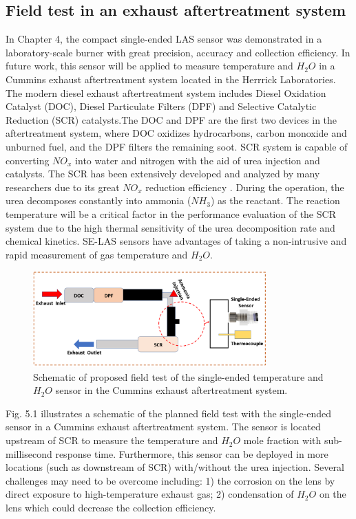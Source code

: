 \subsection{Field test in an exhaust aftertreatment system}
In Chapter 4, the compact single-ended LAS sensor was demonstrated in a laboratory-scale burner with great precision, accuracy and collection efficiency. In future work, this sensor will be applied to measure temperature and $H_2O$ in a Cummins exhaust aftertreatment system located in the Herrrick Laboratories. The modern diesel exhaust aftertreatment system includes Diesel Oxidation Catalyst (DOC), Diesel Particulate Filters (DPF) and Selective Catalytic Reduction (SCR) catalysts.The DOC and DPF are the first two devices in the aftertreatment system, where DOC oxidizes hydrocarbons, carbon monoxide and unburned fuel, and the DPF filters the remaining soot. SCR system is capable of converting $NO_x$ into water and nitrogen with the aid of urea injection and catalysts. The SCR has been extensively developed and analyzed by many researchers due to its great $NO_x$ reduction efficiency \cite{asif2015urea,southern1993demonstration,recsitouglu2015pollutant,GUAN2014395,doi:10.1177/0142331216656754,qi2003performance,saito2003development,muzio2002overview,gieshoff2000improved,sluder2005low,lei2013influence}. During the operation, the urea decomposes constantly into ammonia ($NH_3$) as the reactant. The reaction temperature will be a critical factor in the performance evaluation of the SCR system due to the high thermal sensitivity of the urea decomposition rate and chemical kinetics. SE-LAS sensors have advantages of taking a non-intrusive and rapid measurement of gas temperature and $H_2O$.

 \begin{figure}[ht]
    \centering       
    \includegraphics[width=0.8\textwidth]{fig/ch5_fig1.PNG}
        \caption{Schematic of proposed field test of the single-ended temperature and $H_2O$ sensor in the Cummins exhaust aftertreatment system.}
    \label{fig:ch5_1}
\end{figure}

Fig. 5.1 illustrates a schematic of the planned field test with the single-ended sensor in a Cummins exhaust aftertreatment system. The sensor is located upstream of SCR to measure the temperature and $H_2O$ mole fraction with sub-millisecond response time. Furthermore, this sensor can be deployed in more locations (such as downstream of SCR) with/without the urea injection. Several challenges may need to be overcome including: 1) the corrosion on the lens by direct exposure to high-temperature exhaust gas; 2) condensation of $H_2O$ on the lens which could decrease the collection efficiency. 
 
